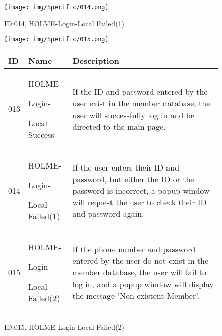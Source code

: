 \documentclass[conference]{IEEEtran}
\begin{document}
\begin{enumerate}
\begin{figure}[h]
\centering
\texttt{[image: img/Specific/014.png]}
\caption{ID:014, HOLME-Login-Local Failed(1)}

\texttt{[image: img/Specific/015.png]}
\caption{ID:015, HOLME-Login-Local Failed(2)}
\begin{tabular}{|p{1cm}|p{1.8cm}|p{5.0cm}|}
    \hline
    ID & Name & Description\\ \hline
013 \par  & HOLME-\par Login-\par Local Success &If the ID and password entered by the user exist in the member database, the user will successfully log in and be directed to the main page.\\ \hline
014 \par  & HOLME-\par Login-\par Local Failed(1) &If the user enters their ID and password, but either the ID or the password is incorrect, a popup window will request the user to check their ID and password again.\\ \hline
015 \par  & HOLME-\par Login-\par Local Failed(2) &If the phone number and password entered by the user do not exist in the member database, the user will fail to log in, and a popup window will display the message 'Non-existent Member'.\\ \hline
\end{tabular}
\end{figure}




\end{enumerate}
\end{document}
